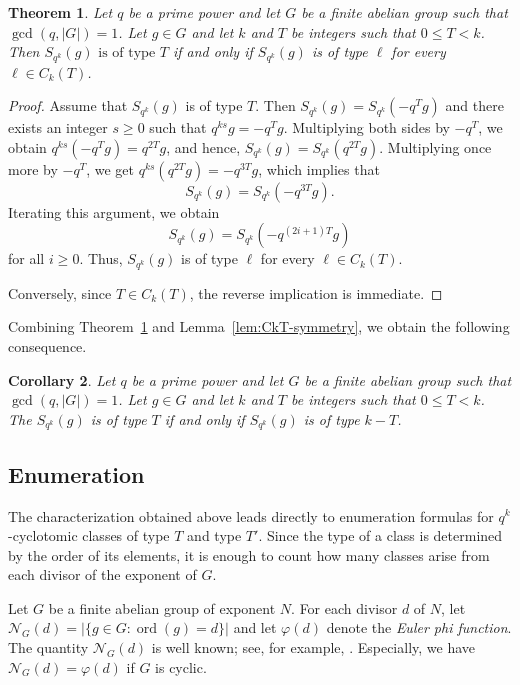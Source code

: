 \documentclass[pdflatex,sn-mathphys-num]{sn-jnl}%
\theoremstyle{thmstyleone}%
\newtheorem{theorem}{Theorem}%
\newtheorem{corollary}[theorem]{Corollary}%
\theoremstyle{thmstyletwo}%
\theoremstyle{thmstylethree}%
\newcommand{\ord}{\operatorname{ord}}
\begin{document}
\begin{theorem}\label{thm:CkT-propagation}
Let $q$ be a prime power and let  $G$ be a finite abelian group  such that $\gcd(q, |G|)=1$. Let  $g\in G$ and let $k$ and $T$ be integers such that $0\le T<k$. Then $
S_{q^k}(g)\text{ is of type }T
$
if and only if
$
S_{q^k}(g) $ is of type $\ell$ for every $\ell\in C_k(T)$.
\end{theorem}

\begin{proof}
Assume that $S_{q^k}(g)$ is of type $T$. Then
$
S_{q^k}(g)=S_{q^k}(-q^Tg)$ and there exists an integer $s\ge 0$ such that
$
q^{ks}g=-q^Tg$.
Multiplying both sides by $-q^T$, we obtain
$
q^{ks}(-q^Tg)=q^{2T}g$,
and hence, $
S_{q^k}(g)=S_{q^k}(q^{2T}g)$.
Multiplying once more by $-q^T$, we get
$
q^{ks}(q^{2T}g)=-q^{3T}g$,
which implies that 
\[
S_{q^k}(g)=S_{q^k}(-q^{3T}g).
\]
Iterating this argument, we obtain
\[
S_{q^k}(g)=S_{q^k}(-q^{(2i+1)T}g)
 \] for all $i\ge 0$.
Thus,  $S_{q^k}(g)$ is of type $\ell$ for every $\ell\in C_k(T)$.

Conversely, since $T\in C_k(T)$, the reverse implication is immediate.
\end{proof}

Combining Theorem~\ref{thm:CkT-propagation} and Lemma~\ref{lem:CkT-symmetry}, we obtain the following consequence.

\begin{corollary}\label{cor:type-k-minus-T}
Let $q$ be a prime power and let  $G$ be a finite abelian group  such that $\gcd(q, |G|)=1$. Let  $g\in G$ and let $k$ and $T$ be integers such that $0\le T<k$.  The $
S_{q^k}(g)$  is of type $T$  if and only if $
S_{q^k}(g)$  is of type $k-T$.
\end{corollary}

 

\subsection{Enumeration}
The characterization obtained above leads directly to enumeration formulas for $q^k$-cyclotomic classes of type $T$ and type $T'$. Since the type of a class is determined by the order of its elements, it is enough to count how many classes arise from each divisor of the exponent of $G$.

Let $G$ be a finite abelian group of exponent $N$. For each divisor $d$ of $N$, let
$
\mathcal{N}_G(d)=\bigl|\{g\in G:\ord(g)=d\}\bigr|$ and let  $\varphi(d)$ denote the \emph{Euler phi function}.
The quantity $\mathcal{N}_G(d)$ is well known; see, for example, \cite{B1997}.  Especially,  we have   $\mathcal{N}_G(d)=\varphi(d)$  if $G$ is cyclic.
 
\end{document}

